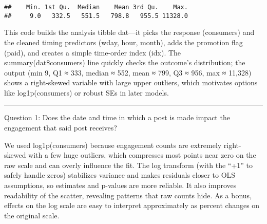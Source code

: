 \documentclass[
]{article}
\begin{document}
\begin{verbatim}
##    Min. 1st Qu.  Median    Mean 3rd Qu.    Max. 
##     9.0   332.5   551.5   798.8   955.5 11328.0
\end{verbatim}

This code builds the analysis tibble dat---it picks the response
(consumers) and the cleaned timing predictors (wday, hour, month), adds
the promotion flag (paid), and creates a simple time-order index (idx).
The summary(dat\$consumers) line quickly checks the outcome's
distribution; the output (min 9, Q1 ≈ 333, median ≈ 552, mean ≈ 799, Q3
≈ 956, max ≈ 11,328) shows a right-skewed variable with large upper
outliers, which motivates options like log1p(consumers) or robust SEs in
later models.

\begin{center}\rule{0.5\linewidth}{0.5pt}\end{center}

Question 1: Does the date and time in which a post is made impact the
engagement that said post receives?

We used log1p(consumers) because engagement counts are extremely
right-skewed with a few huge outliers, which compresses most points near
zero on the raw scale and can overly influence the fit. The log
transform (with the ``+1'' to safely handle zeros) stabilizes variance
and makes residuals closer to OLS assumptions, so estimates and p-values
are more reliable. It also improves readability of the scatter,
revealing patterns that raw counts hide. As a bonus, effects on the log
scale are easy to interpret approximately as percent changes on the
original scale.
\end{document}
